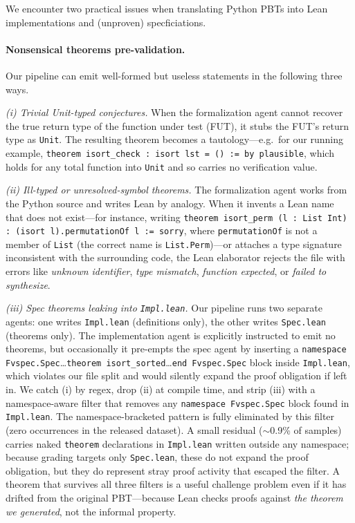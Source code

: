 We encounter two practical issues when translating Python PBTs into Lean implementations and (unproven) specficiations.

\paragraph{Nonsensical theorems pre-validation.} Our pipeline can emit well-formed but useless statements in the following three ways.

\emph{(i) Trivial Unit-typed conjectures.} When the formalization agent cannot recover the true return type of the function under test (FUT), it stubs the FUT's return type as \texttt{Unit}. The resulting theorem becomes a tautology---e.g.\ for our running example, \texttt{theorem isort\_check : isort lst = () := by plausible}, which holds for any total function into \texttt{Unit} and so carries no verification value.

\emph{(ii) Ill-typed or unresolved-symbol theorems.} The formalization agent works from the Python source and writes Lean by analogy. When it invents a Lean name that does not exist---for instance, writing \texttt{theorem isort\_perm (l : List Int) : (isort l).permutationOf l := sorry}, where \texttt{permutationOf} is not a member of \texttt{List} (the correct name is \texttt{List.Perm})---or attaches a type signature inconsistent with the surrounding code, the Lean elaborator rejects the file with errors like \emph{unknown identifier}, \emph{type mismatch}, \emph{function expected}, or \emph{failed to synthesize}.

\emph{(iii) Spec theorems leaking into \texttt{Impl.lean}.} Our pipeline runs two separate agents: one writes \texttt{Impl.lean} (definitions only), the other writes \texttt{Spec.lean} (theorems only). The implementation agent is explicitly instructed to emit no theorems, but occasionally it pre-empts the spec agent by inserting a \texttt{namespace Fvspec.Spec}\ldots\texttt{theorem isort\_sorted}\ldots \texttt{end Fvspec.Spec} block inside \texttt{Impl.lean}, which violates our file split and would silently  expand the proof obligation if left in.                         
We catch (i) by regex, drop (ii) at compile time, and strip (iii) with a namespace-aware filter that removes any \texttt{namespace Fvspec.Spec} block found in \texttt{Impl.lean}. The namespace-bracketed pattern is fully eliminated by this filter (zero occurrences in the released dataset). A small residual ($\sim$0.9\% of samples) carries naked \texttt{theorem} declarations in \texttt{Impl.lean} written outside any namespace; because grading targets only \texttt{Spec.lean}, these do not expand the proof obligation, but they do represent stray proof activity that escaped the filter. A theorem that survives all three filters is a useful challenge problem even if it has drifted from the original PBT---because Lean checks proofs against \emph{the theorem we generated}, not the informal property.



